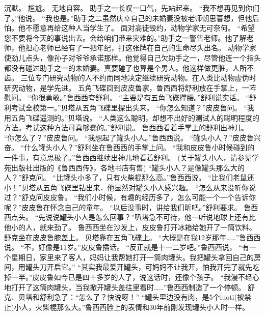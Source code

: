 \documentclass[a4paper,12pt,UTF8,twoside]{ctexbook}
\begin{document}
        沉默。 
        尴尬。 
        无地自容。 
        助手之一长叹一口气，先站起来。 
        “我不想再见到你们了。”他说。 
        “我也是。”助手之二虽然庆幸自己的未婚妻没被老师朝思暮想，但他后怕。他不愿意再给这种人当学生了。 
        面对高徒毁约，动物学家无可奈何。 
        “希望您不要将今天的事说出去。会给咱们带来灾难的。”助手之一警告老师。他了解老师，他担心老师已经有了一把年纪，打这张牌在自己的生命尽头出名。 
        动物学家使劲儿点头，像孙子对爷爷承诺那样。他觉得自己欠助手之一，尽管他连一个指头都没有碰过助手之一的未婚妻。真要碰了也算是个男人。他这样做更脏，人所不齿。 
        三位专门研究动物的人不约而同地决定继续研究动物。在人类比动物虚伪时研究动物，是学先进。 
        五角飞碟回到皮皮鲁家，鲁西西将舒利放在手掌上，一阵慰问。 
        “你很勇敢。”鲁西西夸舒利。 
        “主要是有五角飞碟撑腰。”舒利说实话。 
        “舒利考试全校第一。”贝塔从五角飞碟里探出头来。 
        “你怎么知道？”皮皮鲁问。 
        “我用五角飞碟遥测的。”贝塔说。 
        “人类这么聪明，却想不出好的测试人的聪明程度的方法。考试这种方法可真够蠢的。”舒利说。 
        鲁西西看着手掌上的舒利出神儿。 
        “你怎么了？”皮皮鲁问。 
        “我想起了罐头小人。”鲁西西说。 
        “罐头小人？”皮皮鲁兴奋。 
        “什么罐头小人？”舒利坐在鲁西西的手掌上问。 
        “我和皮皮鲁小时候碰到的一件事，有意思极了。”鲁西西继续出神儿地看着舒利。 
        (关于罐头小人，请参见学苑出版社出版的《鲁西西传》，各地书店有售) 
        “罐头小人？是像罐头那么大的人？”舒克问。 
        “比罐头小多了，只有火柴棍那么高。”鲁西西说。 
        “比我们老鼠还小！”贝塔从五角飞碟里钻出来．他显然对罐头小人感兴趣。 
        “怎么从来没听你说过？”舒克问皮皮鲁。 
        “我们小时候，有趣的经历多了，怎么可能一个一个告诉你呢？”皮皮鲁在怀念自己的童年。 
        “以后没事时，讲给我们昕吧。”舒利要求。 
        鲁西西点头。 
        “先说说罐头小人是怎么回事？”叭塔急不可待，他一听说地球上还有比他小的人，就来劲了。 
        鲁西西坐在沙发上，皮皮鲁打开冰箱给她开了一筒饮料。 
        舒克坐在皮皮鲁膝盖上。 
        贝塔靠在五角飞碟上。 
        “大概是在我12岁那年……”鲁西西说。 
        “不，好像是11岁。”皮皮鲁插话。 
        “反正就是十一二岁吧。”鲁西西说，  “有一个星期日，家里来了客人，妈妈让我帮她打开一筒肉罐头。我把罐头拿回自己的房间，用罐头刀开启它。” 
        “其实我最爱开罐头，可妈妈不让我开，怕我开完了就先吃掉一半。”皮皮鲁如今已是四十多岁的人了，说这话时，还像个孩子。 
        “我漫不经心地打开了这筒肉罐头，当我掀开罐头盖往里看时……”鲁西西制造了一个停顿。 
        舒克、贝塔和舒利急了：“怎么了？快说呀！” 
        “罐头里边没有肉，是5个luoti(被禁止)小人，火柴棍那么大。”鲁西西脸上的表情和30年前刚发现罐头小人时一样。 
\end{document}

